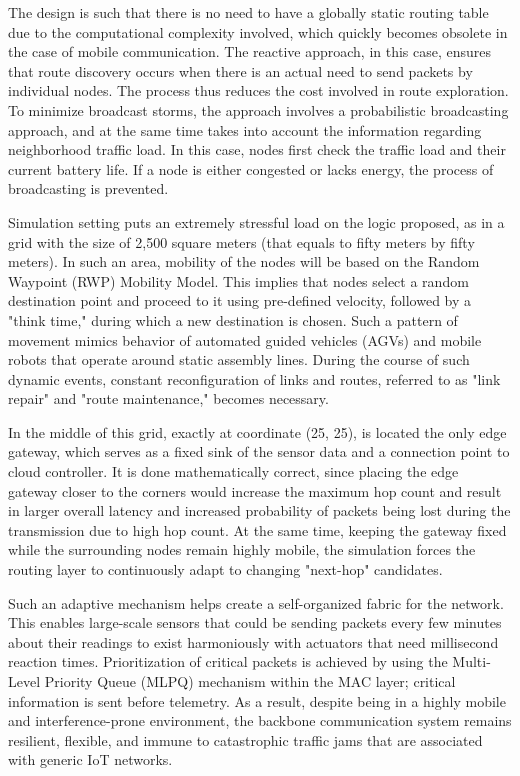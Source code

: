 \documentclass[a4paper,fleqn]{cas-dc}
\numberwithin{equation}{section}
\begin{document}
The design is such that there is no need to have a globally static routing table due to the computational complexity involved, which quickly becomes obsolete in the case of mobile communication. The reactive approach, in this case, ensures that route discovery occurs when there is an actual need to send packets by individual nodes. The process thus reduces the cost involved in route exploration. To minimize broadcast storms, the approach involves a probabilistic broadcasting approach, and at the same time takes into account the information regarding neighborhood traffic load. In this case, nodes first check the traffic load and their current battery life. If a node is either congested or lacks energy, the process of broadcasting is prevented.

Simulation setting puts an extremely stressful load on the logic proposed, as in a grid with the size of 2,500 square meters (that equals to fifty meters by fifty meters). In such an area, mobility of the nodes will be based on the Random Waypoint (RWP) Mobility Model. This implies that nodes select a random destination point and proceed to it using pre-defined velocity, followed by a "think time," during which a new destination is chosen. Such a pattern of movement mimics behavior of automated guided vehicles (AGVs) and mobile robots that operate around static assembly lines. During the course of such dynamic events, constant reconfiguration of links and routes, referred to as "link repair" and "route maintenance," becomes necessary.

In the middle of this grid, exactly at coordinate (25, 25), is located the only edge gateway, which serves as a fixed sink of the sensor data and a connection point to cloud controller. It is done mathematically correct, since placing the edge gateway closer to the corners would increase the maximum hop count and result in larger overall latency and increased probability of packets being lost during the transmission due to high hop count. At the same time, keeping the gateway fixed while the surrounding nodes remain highly mobile, the simulation forces the routing layer to continuously adapt to changing "next-hop" candidates.

Such an adaptive mechanism helps create a self-organized fabric for the network. This enables large-scale sensors that could be sending packets every few minutes about their readings to exist harmoniously with actuators that need millisecond reaction times. Prioritization of critical packets is achieved by using the Multi-Level Priority Queue (MLPQ) mechanism within the MAC layer; critical information is sent before telemetry. As a result, despite being in a highly mobile and interference-prone environment, the backbone communication system remains resilient, flexible, and immune to catastrophic traffic jams that are associated with generic IoT networks.
\end{document}
